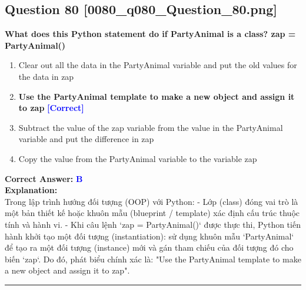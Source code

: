 \documentclass[11pt,a4paper]{article}
\begin{document}
\begin{minipage}{\textwidth}
\subsection*{Question 80 \quad \footnotesize{[0080_q080_Question_80.png]}}
\noindent \textbf{What does this Python statement do if PartyAnimal is a class? zap = PartyAnimal()}

\begin{enumerate}[label=\Alph*.]
    \item Clear out all the data in the PartyAnimal variable and put the old values for the data in zap
    \item \textbf{Use the PartyAnimal template to make a new object and assign it to zap} \hfill \textcolor{blue}{\textbf{[Correct]}}
    \item Subtract the value of the zap variable from the value in the PartyAnimal variable and put the difference in zap
    \item Copy the value from the PartyAnimal variable to the variable zap
\end{enumerate}

\noindent \textbf{Correct Answer:} \textcolor{blue}{\textbf{B}} \\[4pt]
\noindent \textbf{Explanation:}\\
Trong lập trình hướng đối tượng (OOP) với Python:\newline
- Lớp (class) đóng vai trò là một bản thiết kế hoặc khuôn mẫu (blueprint / template) xác định cấu trúc thuộc tính và hành vi.\newline
- Khi câu lệnh `zap = PartyAnimal()` được thực thi, Python tiến hành khởi tạo một đối tượng (instantiation): sử dụng khuôn mẫu `PartyAnimal` để tạo ra một đối tượng (instance) mới và gán tham chiếu của đối tượng đó cho biến `zap`.\newline
Do đó, phát biểu chính xác là: "Use the PartyAnimal template to make a new object and assign it to zap".
\end{minipage}
\vspace{0.8cm}
\hrule
\vspace{0.5cm}
\end{document}
